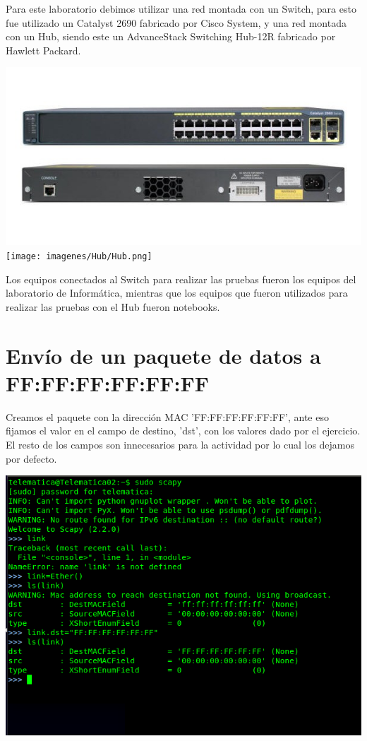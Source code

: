 \documentclass[spanish]{udpreport}
\begin{document}
Para este laboratorio debimos utilizar una red montada con un Switch, para esto fue utilizado un Catalyst 2690 fabricado por Cisco System, y una red montada con un Hub, siendo este un AdvanceStack Switching Hub-12R fabricado por Hawlett Packard.

\begin{center}
	\includegraphics[scale=.5]{imagenes/Switch/switch.png}
	\texttt{[image: imagenes/Hub/Hub.png]}
	\linebreak
\end{center}

Los equipos conectados al Switch para realizar las pruebas fueron los equipos del laboratorio de Informática, mientras que los equipos que fueron utilizados para realizar las pruebas con el Hub fueron notebooks.

\newpage


\section{Envío de un paquete de datos a FF:FF:FF:FF:FF:FF}

Creamos el paquete con la dirección MAC 'FF:FF:FF:FF:FF:FF', ante eso fijamos el valor en el campo de destino, 'dst', con los valores dado por el ejercicio. El resto de los campos son innecesarios para la actividad por lo cual los dejamos por defecto.

\begin{center}
	\includegraphics[scale=.37]{imagenes/Switch/Test_1a_b.png}
\end{center}
\end{document}
